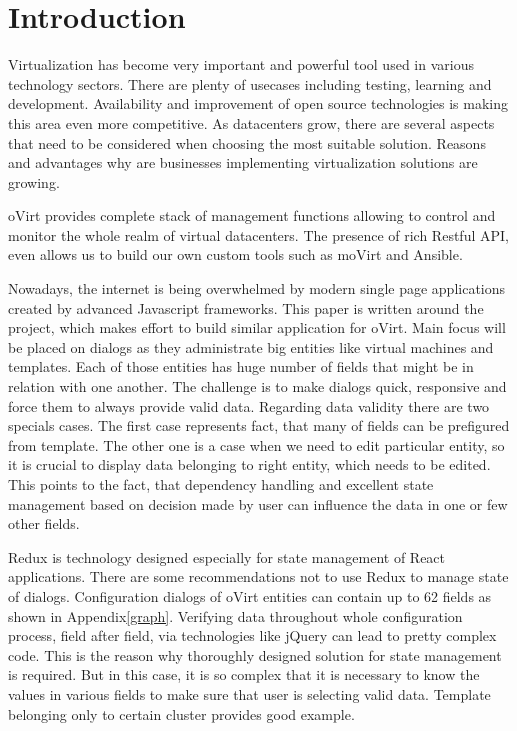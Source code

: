 \renewcommand{\lstlistingname}{Code sample}
\chapter{Introduction}
Virtualization has become very important and powerful tool used in various technology sectors. There are plenty of usecases including testing, learning and development. Availability and improvement of open source technologies is making this area even more competitive. As datacenters grow, there are several aspects that need to be considered when choosing the most suitable solution. Reasons and advantages why are businesses implementing virtualization solutions are growing\cite{virtualization}.

oVirt\cite{oVirt} provides complete stack of management functions allowing to control and monitor the whole realm of virtual datacenters. The presence of rich Restful API, even allows us to build our own custom tools such as moVirt\cite{moVirt} and Ansible\cite{Ansible}. 

Nowadays, the internet is being overwhelmed by modern single page applications created by advanced Javascript frameworks. This paper is written around the project, which makes effort to build similar application for oVirt. Main focus will be placed on dialogs as they administrate big entities like virtual machines and templates. Each of those entities has huge number of fields that might be in relation with one another. The challenge is to make dialogs quick, responsive and force them to always provide valid data. Regarding data validity there are two specials cases. The first case represents fact, that many of fields can be prefigured from template. The other one is a case when we need to edit particular entity, so it is crucial to display data belonging to right entity, which needs to be edited. This points to the fact, that dependency handling and excellent state management based on decision made by user can influence the data in one or few other fields.

Redux is technology designed especially for state management of React\cite{React} applications. There are some recommendations not to use Redux\cite{Redux} to manage state of dialogs. Configuration dialogs of oVirt entities can contain up to 62 fields as shown in Appendix\ref{graph}. Verifying data throughout whole configuration process, field after field, via technologies like jQuery can lead to pretty complex code. This is the reason why thoroughly designed solution for state management is required. But in this case, it is so complex that it is necessary to know the values in various fields to make sure that user is selecting valid data. Template belonging only to certain cluster provides good example.

